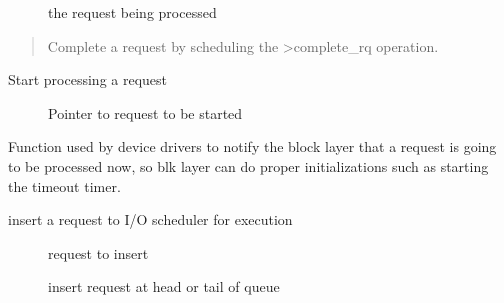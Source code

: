 \documentclass[a4paper,11pt,english]{sphinxmanual}
\begin{document}
\begin{description}
\item[{}] \leavevmode
the request being processed

\end{description}

\begin{quote}

Complete a request by scheduling the \sphinxhyphen{}\textgreater{}complete\_rq operation.
\end{quote}

\begin{fulllineitems}
\label{\detokenize{blk-mq:c.blk_mq_start_request}}
Start processing a request

\end{fulllineitems}


\begin{description}
\item[{}] \leavevmode
Pointer to request to be started

\end{description}


Function used by device drivers to notify the block layer that a request
is going to be processed now, so blk layer can do proper initializations
such as starting the timeout timer.

\begin{fulllineitems}
\label{\detokenize{blk-mq:c.blk_execute_rq_nowait}}
insert a request to I/O scheduler for execution

\end{fulllineitems}


\begin{description}
\item[{}] \leavevmode
request to insert

\item[{}] \leavevmode
insert request at head or tail of queue

\end{description}
\end{document}
